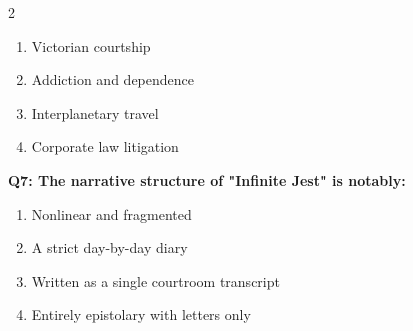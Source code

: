 \documentclass[10pt]{article}
\begin{document}
\begin{multicols}{2}
\begin{enumerate}[label=\arabic*.]
\item Victorian courtship
\item Addiction and dependence
\item Interplanetary travel
\item Corporate law litigation
\end{enumerate}
\textbf{Q7: The narrative structure of "Infinite Jest" is notably:}

\begin{enumerate}[label=\arabic*.]
\item Nonlinear and fragmented
\item A strict day-by-day diary
\item Written as a single courtroom transcript
\item Entirely epistolary with letters only
\end{enumerate}
\end{multicols}

\newpage
\end{document}
